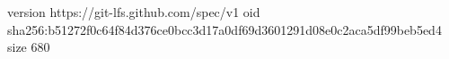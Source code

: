 version https://git-lfs.github.com/spec/v1
oid sha256:b51272f0c64f84d376ce0bcc3d17a0df69d3601291d08e0c2aca5df99beb5ed4
size 680
